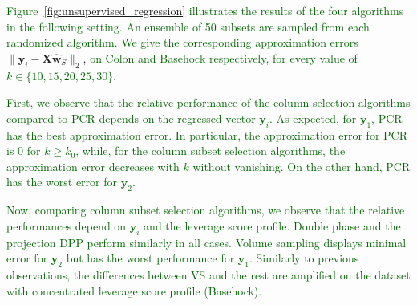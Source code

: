 \documentclass[twoside,11pt]{book}
\newcommand{\rev}[1]{\textcolor{darkgreen}{#1}}
\numberwithin{theorem}{chapter}
\numberwithin{definition}{chapter}
\numberwithin{proposition}{chapter}
\numberwithin{corollary}{chapter}
\numberwithin{example}{chapter}
\numberwithin{lemma}{chapter}
\numberwithin{assumption}{chapter}
\DeclareMathOperator{\Span}{\mathrm{Span}}
\begin{document}


\rev{Figure}~\ref{fig:unsupervised_regression} \rev{illustrates the results of the four algorithms in the following setting. An ensemble of 50 subsets are sampled from each randomized algorithm. We give the corresponding approximation errors} $\|\mathbf{y}_{i} - \bm{X}\hat{\bm{w}}_S\|_{2}$, \rev{on Colon and Basehock respectively, for every value of $k \in \{10,15,20,25,30\}$}.

\rev{First, we observe that the relative performance of the column selection algorithms compared to PCR depends on the regressed vector $\mathbf{y}_{i}$. As expected, for $\mathbf{y}_{1}$, PCR has the best approximation error. In particular, the approximation error for PCR is $0$ for $k \geq k_{0}$, while, for the column subset selection algorithms, the approximation error decreases with $k$ without vanishing. On the other hand, PCR has the worst error for $\mathbf{y}_{2}$.
}

\rev{
Now, comparing column subset selection algorithms, we observe that the relative performances depend on $\mathbf{y}_{i}$ and the leverage score profile. Double phase and the projection DPP perform similarly in all cases. \rev{Volume sampling displays minimal error for $\mathbf{y}_{2}$ but has the worst performance for $\mathbf{y}_{1}$. Similarly to previous observations, } the differences between VS and the rest are amplified on the dataset with concentrated leverage score profile (Basehock).
}
\end{document}
